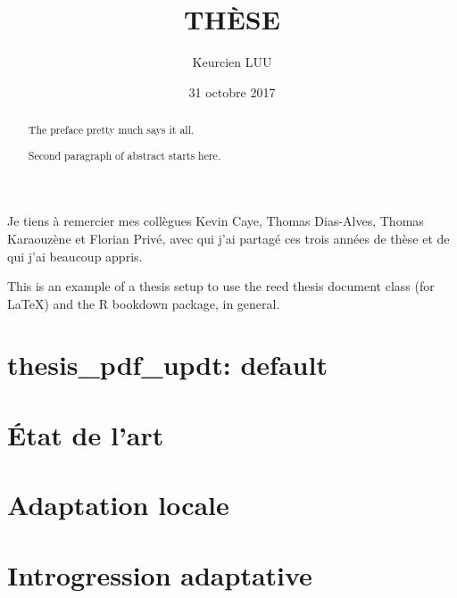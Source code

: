 \documentclass[12pt,twoside]{reedthesis}
\title{THÈSE}
\author{Keurcien LUU}
\date{31 octobre 2017}
\theoremstyle{definition}
\theoremstyle{definition}
\theoremstyle{remark}
\begin{document}
      \maketitle
  
  \frontmatter %
  \pagestyle{empty} %

      \begin{acknowledgements}
      Je tiens à remercier mes collègues Kevin Caye, Thomas Dias-Alves, Thomas
      Karaouzène et Florian Privé, avec qui j'ai partagé ces trois années de
      thèse et de qui j'ai beaucoup appris.
    \end{acknowledgements}
  
      \begin{preface}
      This is an example of a thesis setup to use the reed thesis document
      class (for LaTeX) and the R bookdown package, in general.
    \end{preface}
  
      \hypersetup{linkcolor=black}
    \setcounter{tocdepth}{2}
    \tableofcontents
  
      \listoftables
  
      \listoffigures
  
      \begin{abstract}
      The preface pretty much says it all. \par  Second paragraph of abstract
      starts here.
    \end{abstract}
  
  
  \mainmatter %
  \pagestyle{fancyplain} %

  \chapter{thesis\_pdf\_updt: default}\label{thesis_pdf_updt-default}
  
  \chapter{État de l'art}\label{etat-de-lart}
  
  \chapter{Adaptation locale}\label{adaptation-locale}
  
  \chapter{Introgression adaptative}\label{introgression-adaptative}
  
\end{document}
